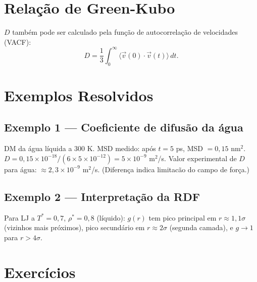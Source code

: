 \documentclass[12pt,a4paper]{article}
\begin{document}
\section*{Rela\c{c}\~ao de Green-Kubo}

$D$ tamb\'em pode ser calculado pela fun\c{c}\~ao de autocorrela\c{c}\~ao de velocidades (VACF):
\[
D = \frac{1}{3}\int_0^\infty \langle\vec{v}(0)\cdot\vec{v}(t)\rangle\,dt.
\]

\section*{Exemplos Resolvidos}

\subsection*{Exemplo 1 --- Coeficiente de difus\~ao da \'agua}
DM da \'agua l\'iquida a 300 K. MSD medido: ap\'os $t=5$ ps, MSD $= 0{,}15$ nm$^2$.
$D = 0{,}15\times10^{-18}/(6\times5\times10^{-12}) = 5\times10^{-9}$ m$^2$/s.
Valor experimental de $D$ para \'agua: $\approx 2{,}3\times10^{-9}$ m$^2$/s. (Diferen\c{c}a indica limitac\~ao do campo de for\c{c}a.)

\subsection*{Exemplo 2 --- Interpreta\c{c}\~ao da RDF}
Para LJ a $T^*=0{,}7$, $\rho^*=0{,}8$ (l\'iquido): $g(r)$ tem pico principal em $r\approx1{,}1\sigma$ (vizinhos mais pr\'oximos), pico secund\'ario em $r\approx2\sigma$ (segunda camada), e $g\to1$ para $r>4\sigma$.

\section*{Exerc\'icios}
\end{document}
